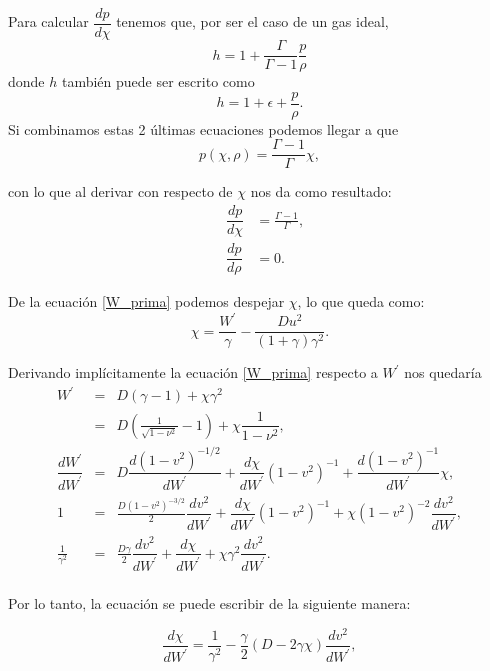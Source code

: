 \documentclass[12pt,a4paper]{book}
\begin{document}
\noindent Para calcular $\dfrac{dp}{d\chi}$ tenemos que, por ser el caso de un gas ideal,
\begin{equation} \label{entalpía_función_presion_densidad}
h=1+\frac{\Gamma}{\Gamma-1}\frac{p}{\rho}
\end{equation}
donde $h$ también puede ser escrito como
\begin{equation}
h=1+\epsilon+\frac{p}{\rho}.
\end{equation}
Si combinamos estas 2 últimas ecuaciones podemos llegar a que 
\begin{equation}
p(\chi,\rho)=\frac{\Gamma-1}{\Gamma}\chi ,
\end{equation}

\noindent con lo que al derivar con respecto de $\chi$ nos da como resultado:
\begin{eqnarray}\label{der_presion}
& \dfrac{d p}{d \chi}&=\frac{\Gamma-1}{\Gamma} ,\\ &\dfrac{d p}{d \rho}&= 0.
\end{eqnarray}

\noindent De la ecuación \ref{W_prima} podemos despejar $\chi$, lo que queda como:
\begin{equation}
\chi=\frac{W^{'}}{\gamma}- \frac{D u^{2}}{(1+\gamma)\gamma^{2}}.
\end{equation}

\noindent Derivando implícitamente la ecuación \ref{W_prima} respecto a $W^{'}$ nos quedaría
\begin{eqnarray*}
W^{'}&=&D\left(\gamma-1 \right) + \chi \gamma^{2}\\%
&=& D\left(\frac{1}{\sqrt{1-\nu^{2}}} -1\right)+\chi \dfrac{1}{1-\nu^{2}}, \\%
\dfrac{d W^{'}}{d W^{'}} &=& D \dfrac{d (1-v^2)^{-1/2}}{d W^{'}}+\dfrac{d \chi}{dW^{'}}(1-v^2)^{-1}+\dfrac{d (1-v^2)^{-1} }{d W^{'}}\chi, \\  %
1 &=& \frac{D(1-v^2)^{-3/2}}{2} \dfrac{d v^{2}}{d W^{'}}+\dfrac{d \chi}{dW^{'}}(1-v^2)^{-1}+ \chi (1-v^2)^{-2}  \dfrac{d v^{2}}{d W^{'}}, \\ %
\frac{1}{\gamma ^2} &=& \frac{D \gamma}{2} \dfrac{d v^{2}}{d W^{'}} + \dfrac{d \chi}{dW^{'}} + \chi \gamma^2 \dfrac{d v^2}{dW^{'}}. \\ %
\end{eqnarray*}

\noindent Por lo tanto, la ecuación se puede escribir de la siguiente manera:

\begin{equation}\label{der_chi}
\dfrac{d \chi}{dW^{'}}=\frac{1}{\gamma^2}-\frac{\gamma}{2}(D-2\gamma \chi) \dfrac{d v^2}{dW^{'}},
\end{equation}
\end{document}
